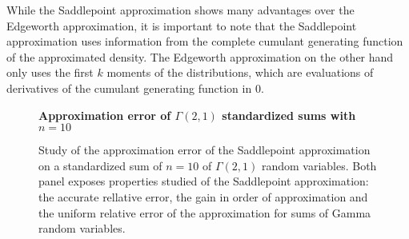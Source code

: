 While the Saddlepoint approximation shows many advantages over the Edgeworth approximation, it is important to note that the Saddlepoint approximation uses information from the complete cumulant generating function of the approximated density. The Edgeworth approximation on the other hand only uses the first $k$ moments of the distributions, which are evaluations of derivatives of the cumulant generating function in 0. 

\begin{figure}[h]
    \textbf{Approximation error of $\Gamma(2,1)$ standardized sums with $n=10$}
    \centering
    \caption{Study of the approximation error of the Saddlepoint approximation on a standardized sum of $n=10$ of $\Gamma(2, 1)$ random variables. Both panel exposes properties studied of the Saddlepoint approximation: the accurate rellative error, the gain in order of approximation and the uniform relative error of the approximation for sums of Gamma random variables.}
    \label{fig-saddlepoint-err}
\end{figure}

